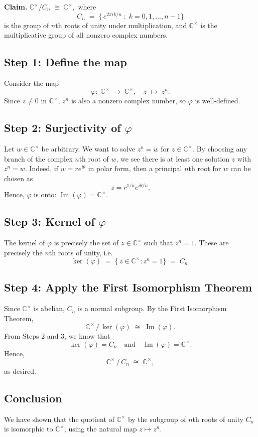 \documentclass[12pt]{article}
\theoremstyle{definition} %
\theoremstyle{plain} %
\begin{document}
\noindent
\textbf{Claim.} $\displaystyle \mathbb{C}^{\times} \big/ C_n \;\cong\; \mathbb{C}^{\times},$ 
where 
\[
C_n \;=\; \bigl\{\, e^{2\pi i k/n}\;:\; k=0,1,\dots,n-1\bigr\}
\]
is the group of $n$th roots of unity under multiplication, and $\mathbb{C}^\times$ is the multiplicative group of all nonzero complex numbers.

\subsection*{Step 1: Define the map}
Consider the map
\[
\varphi:\;\mathbb{C}^\times \;\longrightarrow\;\mathbb{C}^\times,
\quad
z \;\longmapsto\; z^n.
\]
Since $z \neq 0$ in $\mathbb{C}^\times$, $z^n$ is also a nonzero complex number, so $\varphi$ is well-defined.

\subsection*{Step 2: Surjectivity of $\varphi$}
Let $w \in \mathbb{C}^\times$ be arbitrary. We want to solve $z^n = w$ for $z \in \mathbb{C}^\times$. By choosing any branch of the complex $n$th root of $w$, we see there is at least one solution $z$ with $z^n = w$. Indeed, if $w = re^{i\theta}$ in polar form, then a principal $n$th root for $w$ can be chosen as
\[
z = r^{1/n}e^{i \theta/n}.
\]
Hence, $\varphi$ is onto: $\operatorname{Im}(\varphi) = \mathbb{C}^\times$.

\subsection*{Step 3: Kernel of $\varphi$}
The kernel of $\varphi$ is precisely the set of $z \in \mathbb{C}^\times$ such that $z^n = 1$. These are precisely the $n$th roots of unity, i.e.\
\[
\ker(\varphi)
\;=\;
\bigl\{\,z \in \mathbb{C}^\times : z^n = 1 \bigr\}
\;=\;
C_n.
\]

\subsection*{Step 4: Apply the First Isomorphism Theorem}
Since $\mathbb{C}^\times$ is abelian, $C_n$ is a normal subgroup. By the First Isomorphism Theorem,
\[
\mathbb{C}^\times \,\big/\, \ker(\varphi) 
\;\cong\;
\operatorname{Im}(\varphi).
\]
From Steps 2 and 3, we know that
\[
\ker(\varphi) = C_n
\quad\text{and}\quad
\operatorname{Im}(\varphi) = \mathbb{C}^\times.
\]
Hence,
\[
\mathbb{C}^\times \,\big/\, C_n 
\;\cong\; 
\mathbb{C}^\times,
\]
as desired.

\subsection*{Conclusion}
We have shown that the quotient of $\mathbb{C}^\times$ by the subgroup of $n$th roots of unity $C_n$ is isomorphic to $\mathbb{C}^\times$, using the natural map $z \mapsto z^n$.
\end{document}
